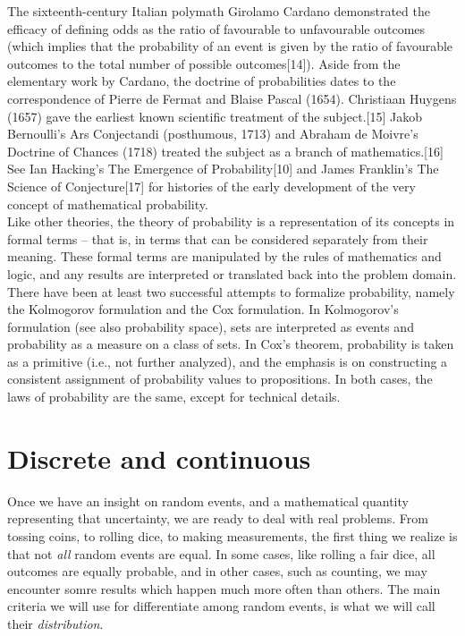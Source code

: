 \documentclass{book}
\begin{document}
The sixteenth-century Italian polymath Girolamo Cardano demonstrated the efficacy of defining odds as the ratio of favourable to unfavourable outcomes (which implies that the probability of an event is given by the ratio of favourable outcomes to the total number of possible outcomes[14]). Aside from the elementary work by Cardano, the doctrine of probabilities dates to the correspondence of Pierre de Fermat and Blaise Pascal (1654). Christiaan Huygens (1657) gave the earliest known scientific treatment of the subject.[15] Jakob Bernoulli's Ars Conjectandi (posthumous, 1713) and Abraham de Moivre's Doctrine of Chances (1718) treated the subject as a branch of mathematics.[16] See Ian Hacking's The Emergence of Probability[10] and James Franklin's The Science of Conjecture[17] for histories of the early development of the very concept of mathematical probability.\\

Like other theories, the theory of probability is a representation of its concepts in formal terms – that is, in terms that can be considered separately from their meaning. These formal terms are manipulated by the rules of mathematics and logic, and any results are interpreted or translated back into the problem domain.\\

There have been at least two successful attempts to formalize probability, namely the Kolmogorov formulation and the Cox formulation. In Kolmogorov's formulation (see also probability space), sets are interpreted as events and probability as a measure on a class of sets. In Cox's theorem, probability is taken as a primitive (i.e., not further analyzed), and the emphasis is on constructing a consistent assignment of probability values to propositions. In both cases, the laws of probability are the same, except for technical details.\\

\section{Discrete and continuous}
Once we have an insight on random events, and a mathematical quantity representing that uncertainty, we are ready to deal with real problems. From tossing coins, to rolling dice, to making measurements, the first thing we realize is that not \textit{all} random events are equal. In some cases, like rolling a fair dice, all outcomes are equally probable, and in other cases, such as counting, we may encounter somre results which happen much more often than others. The main criteria we will use for differentiate among random events, is what we will call their \textit{distribution}.\\
\end{document}
